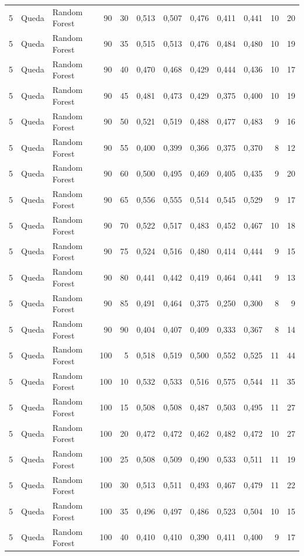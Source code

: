 \begin{longtable}{@{}rllrrrrrrrrr@{}}
5 & Queda & Random Forest & 90 & 30 & 0,513 & 0,507 & 0,476 & 0,411 & 0,441 & 10 & 20 \\
5 & Queda & Random Forest & 90 & 35 & 0,515 & 0,513 & 0,476 & 0,484 & 0,480 & 10 & 19 \\
5 & Queda & Random Forest & 90 & 40 & 0,470 & 0,468 & 0,429 & 0,444 & 0,436 & 10 & 17 \\
5 & Queda & Random Forest & 90 & 45 & 0,481 & 0,473 & 0,429 & 0,375 & 0,400 & 10 & 19 \\
5 & Queda & Random Forest & 90 & 50 & 0,521 & 0,519 & 0,488 & 0,477 & 0,483 & 9 & 16 \\
5 & Queda & Random Forest & 90 & 55 & 0,400 & 0,399 & 0,366 & 0,375 & 0,370 & 8 & 12 \\
5 & Queda & Random Forest & 90 & 60 & 0,500 & 0,495 & 0,469 & 0,405 & 0,435 & 9 & 20 \\
5 & Queda & Random Forest & 90 & 65 & 0,556 & 0,555 & 0,514 & 0,545 & 0,529 & 9 & 17 \\
5 & Queda & Random Forest & 90 & 70 & 0,522 & 0,517 & 0,483 & 0,452 & 0,467 & 10 & 18 \\
5 & Queda & Random Forest & 90 & 75 & 0,524 & 0,516 & 0,480 & 0,414 & 0,444 & 9 & 15 \\
5 & Queda & Random Forest & 90 & 80 & 0,441 & 0,442 & 0,419 & 0,464 & 0,441 & 9 & 13 \\
5 & Queda & Random Forest & 90 & 85 & 0,491 & 0,464 & 0,375 & 0,250 & 0,300 & 8 & 9 \\
5 & Queda & Random Forest & 90 & 90 & 0,404 & 0,407 & 0,409 & 0,333 & 0,367 & 8 & 14 \\
5 & Queda & Random Forest & 100 & 5 & 0,518 & 0,519 & 0,500 & 0,552 & 0,525 & 11 & 44 \\
5 & Queda & Random Forest & 100 & 10 & 0,532 & 0,533 & 0,516 & 0,575 & 0,544 & 11 & 35 \\
5 & Queda & Random Forest & 100 & 15 & 0,508 & 0,508 & 0,487 & 0,503 & 0,495 & 11 & 27 \\
5 & Queda & Random Forest & 100 & 20 & 0,472 & 0,472 & 0,462 & 0,482 & 0,472 & 10 & 27 \\
5 & Queda & Random Forest & 100 & 25 & 0,508 & 0,509 & 0,490 & 0,533 & 0,511 & 11 & 19 \\
5 & Queda & Random Forest & 100 & 30 & 0,513 & 0,511 & 0,493 & 0,467 & 0,479 & 11 & 22 \\
5 & Queda & Random Forest & 100 & 35 & 0,496 & 0,497 & 0,486 & 0,523 & 0,504 & 10 & 15 \\
5 & Queda & Random Forest & 100 & 40 & 0,410 & 0,410 & 0,390 & 0,411 & 0,400 & 9 & 17 \\

\end{longtable}
